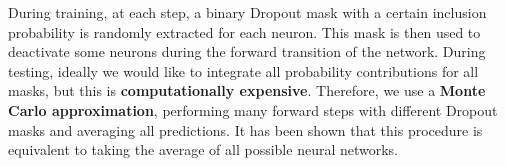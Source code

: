 During training, at each step, a binary Dropout mask with a certain inclusion probability is randomly extracted for each neuron. This mask is then used to deactivate some neurons during the forward transition of the network. During testing, ideally we would like to integrate all probability contributions for all masks, but this is \textbf{computationally expensive}. Therefore, we use a \textbf{Monte Carlo approximation}, performing many forward steps with different Dropout masks and averaging all predictions. It has been shown that this procedure is equivalent to taking the average of all possible neural networks.

